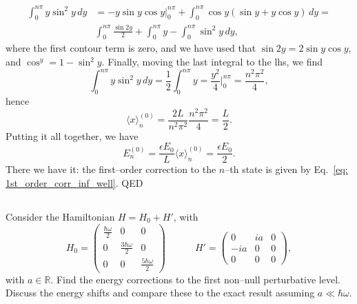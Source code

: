 \begin{equation}
    \begin{split}
        \int_0^{n\pi} y \sin^2 y \, dy & = -y \sin y \cos y \bigg|_0^{n\pi} + \int_0^{n\pi} \cos y (\sin y + y \cos y) \, dy = \\
        & \int_0^{n\pi} \frac{\sin 2y}{2} + \int_0^{n\pi} y - \int_0^{n\pi} \sin^2 y \, dy,
    \end{split}
\end{equation}
where the first contour term is zero, and we have used that $\sin 2y = 2 \sin y \cos y$, and $\cos^y = 1 - \sin^2 y$. Finally, moving the last integral to the lhs, we find
\begin{equation}
    \int_0^{n\pi} y \sin^2 y \, dy = \frac{1}{2} \int_0^{n\pi} y = 
    \frac{y^2}{4} \biggl|_0^{n\pi} = \frac{n^2 \pi^2}{4},
\end{equation}
hence 
\begin{equation}
    \langle x \rangle_n^{(0)} = \frac{2 L}{n^2 \pi^2} \frac{n^2 \pi^2}{4} = \frac{L}{2}.
\end{equation}
Putting it all together, we have
\begin{equation}
    \label{eq: 1st_order_corr_inf_well}
    E_n^{(0)} = \frac{\epsilon E_0}{L} \langle x \rangle_n^{(0)} = \frac{\epsilon E_0}{2}.
\end{equation}
There we have it: the first--order correction to the $n$--th state is given by Eq.~\eqref{eq: 1st_order_corr_inf_well}. QED
\subsection{}
Consider the Hamiltonian $H = H_0 + H'$, with
\begin{equation}
    H_0 = 
    \begin{pmatrix}
        \frac{\hbar \omega}{2} & 0 & 0 \\
        0 & \frac{3 \hbar \omega}{2} & 0 \\
        0 & 0 & \frac{5 \hbar \omega}{2} 
    \end{pmatrix}
    \quad \quad \quad
    H' = 
    \begin{pmatrix}
        0 & ia & 0 \\
        -ia & 0 & 0 \\
        0 & 0 & 0
    \end{pmatrix},
\end{equation}
with $a \in \mathbb{R}$. Find the energy corrections to the first non--null perturbative level. Discuss the energy shifts and compare these to the exact result assuming $ a \ll \hbar \omega$.


